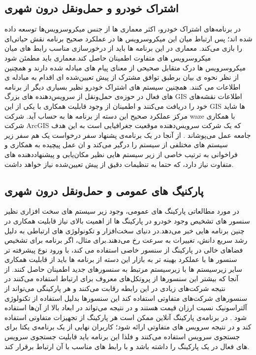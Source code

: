 \subsection{اشتراک خودرو و حمل‌و‌نقل درون شهری}
در برنامه‌ها‌ی اشتراک خودرو، اکثر معماری ها از جنس میکروسرویس‌ها توسعه داده شده اند؛ پس ارتباط میان این میکروسرویس ها در عملکرد صحیح برنامه نقش حیاتی‌ای را بازی می‌کند. معماری در این برنامه ها باید از درخورسازی مناسب رابط های میان میکروسرویس های متفاوت اطمینان حاصل کند.معماری باید مطمئن شود میکروسرویس ها درک متقابل صحیحی از معنای پیام های مبادله شده دارند و همچنین از نظر نحوه ی بیان برطبق توافق مشترک از پیش تعیین‌شده ای اقدام به مبادله ی اطلاعات می کنند. همچنین سیستم های اشتراک خودرو نظیر بسیاری دیگر از برنامه های فعال در حوزه‌ی حمل‌و‌نقل از سرویس‌دهنده های بزرگ‌ GIS اطلاعات نقشه‌های خود را دریافت می‌کنند و اطمینان از وجود قابلیت همکاری با یکی از این GIS ها شاید مرکز عملکرد صحیح این دسته از برنامه ها به حساب آید.
شرکت waze با همکاری شرکت ArcGIS که یک شرکت سرویس‌دهنده موقعیت جغرافیایی است به این هدف جامعه عمل می‌پوشاند \cite{waze_gis} .
از آنجا در یک برنامه‌ی پشنهاد سفر  درخواست یک هم سفر زیر سیستم های مختلفی از سیستم را درگیر می‌کند و ان عمل پیچیده به همکاری و فراخوانی به ترتیب خاصی از زیر سیستم هایی نظیر مکان‌یابی و پیشنهاددهنده های متفاوت نیاز دارد، که حتما به تنظیمات دقیق از پیش تعیین‌شده نیاز خواهد داشت.


\subsection{پارکنیگ های عمومی و حمل‌و‌نقل درون شهری}
در مورد مطالعاتی پارکینگ های عمومی، وجود زیر سیستم های سخت افزاری نظیر سنسور های تشخیص وجود خودرو در پارکینگ ها از اهمیت بالای نیاز قابلیت همکاری در چنین برنامه هایی خبر می‌دهد.در دنیای سخت‌افزار و تکونولوژی های ارتباطی به دلیل رشد سریع دانش، تغییرات به سرعت رخ می‌دهند.برای مثال، اگر برنامه برای تشخیص فضا‌های خالی در پارکینگ از سنسور خاصی استفاده می کند، با ورود نوع پیشرفته تر سنسور ها با عملکرد بهینه تر به بازار این دسته از برنامه ها باید از قابلیت همکاری سایر زیر‌سیستم ها با زیرسیستم مرتبط به سنسور‌های جدید اطمینان حاصل کنند.
از آنجا که بیشتر این سنسورها از پروتکل‌های معروف برای ارتباط استفاده می‌کنند در نتیجه شرکت‌های زیادی در این رابطه رقابت می‌کنند و هر پارکینگی می‌تواند از سنسورهای شرکت‌های متفاوتی استفاده کند این سنسور‌ها بدلیل استفاده از تکنولوژی آلتراسونیک نسبت ارزان قیمت هستند و در نتیجه می‌تواند در ابعاد بالا از آن‌ها استفاده شود \cite{parkwhiz_sensors} .
در برنامه‌ی پارکینگ آنلاین ممکن است هر پارکینگ از تجهیزات متفاوتی استفاده کند و در نتیجه سرویس های متفاوتی ارائه شود؛ کاربران نهایی از یک برنامه‌ی یکتا برای جستجوی سرویس استفاده می‌کنند و فلذا این برنامه باید قابلیت جستجوی سرویس های فعال در یک پارکینگ را داشته باشد و با رابط های مناسب با آن ارتباط برقرار کند.



